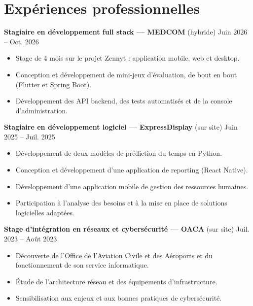 \documentclass[10.5pt,a4paper]{article}
\newcommand{\entry}[2]{\noindent #1 \hfill #2\par}
\newenvironment{tasks}{\begin{itemize}[leftmargin=2.6em,topsep=3pt]}{\end{itemize}\vspace{3pt}}
\begin{document}
\section*{Expériences professionnelles}
\entry{\textbf{Stagiaire en développement full stack — MEDCOM} (hybride)}{Juin 2026 – Oct. 2026}
\begin{tasks}
  \item Stage de 4 mois sur le projet Zennyt : application mobile, web et desktop.
  \item Conception et développement de mini-jeux d’évaluation, de bout en bout (Flutter et Spring Boot).
  \item Développement des API backend, des tests automatisés et de la console d’administration.
\end{tasks}
\entry{\textbf{Stagiaire en développement logiciel — ExpressDisplay} (sur site)}{Juin 2025 – Juil. 2025}
\begin{tasks}
  \item Développement de deux modèles de prédiction du temps en Python.
  \item Conception et développement d’une application de reporting (React Native).
  \item Développement d’une application mobile de gestion des ressources humaines.
  \item Participation à l’analyse des besoins et à la mise en place de solutions logicielles adaptées.
\end{tasks}
\entry{\textbf{Stage d’intégration en réseaux et cybersécurité — OACA} (sur site)}{Juil. 2023 – Août 2023}
\begin{tasks}
  \item Découverte de l’Office de l’Aviation Civile et des Aéroports et du fonctionnement de son service informatique.
  \item Étude de l’architecture réseau et des équipements d’infrastructure.
  \item Sensibilisation aux enjeux et aux bonnes pratiques de cybersécurité.
\end{tasks}
\end{document}
